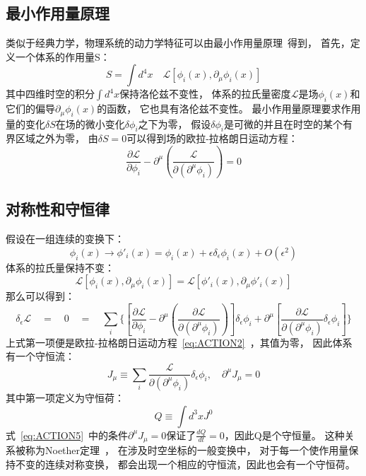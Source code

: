 \subsection{最小作用量原理}
\label{sec:LAP}
类似于经典力学，物理系统的动力学特征可以由最小作用量原理~\cite{ACTION1,ACTION2}得到，
首先，定义一个体系的作用量S：
\begin{equation} 
\label{eq:ACTION1}
S=\int d^4x \quad \mathcal{L}\left[ \phi_i(x),\partial_{\mu}\phi_i(x) \right]
\end{equation}
其中四维时空的积分$\int d^4x$保持洛伦兹不变性，
体系的拉氏量密度$\mathcal{L}$是场$\phi_i(x)$和它们的偏导$\partial_{\mu}\phi_i(x)$的函数，
它也具有洛伦兹不变性。
最小作用量原理要求作用量的变化$\delta S$在场的微小变化$\delta \phi_i$之下为零，
假设$\delta \phi_i$是可微的并且在时空的某个有界区域之外为零，
由$\delta S=0$可以得到场的欧拉-拉格朗日运动方程：
\begin{equation} 
\label{eq:ACTION2}
\frac{\partial\mathcal{L}}{\partial\phi_i}-\partial^{\mu}\left( \frac{\mathcal{L}}{\partial(\partial^{\mu}\phi_i)} \right) =0
\end{equation}

\subsection{对称性和守恒律}
\label{sec:SCL}
假设在一组连续的变换下：
\begin{equation} 
\label{eq:ACTION3}
\phi_i(x) \rightarrow \phi'_i(x)=\phi_i(x)+\epsilon\delta_{\epsilon}\phi_i(x)+O(\epsilon^2)
\end{equation}
体系的拉氏量保持不变：
\begin{equation} 
\label{eq:ACTION4}
\mathcal{L}\left[ \phi_i(x),\partial_{\mu}\phi_i(x) \right]=\mathcal{L}\left[ \phi'_i(x),\partial_{\mu}\phi'_i(x) \right]
\end{equation}
那么可以得到：
\begin{equation} 
\label{eq:ACTION5}
\delta_{\epsilon}\mathcal{L} \quad = \quad 0 \quad = \quad \sum_i \Bigg\{ \left[ \frac{\partial\mathcal{L}}{\partial\phi_i}-\partial^{\mu}\left( \frac{\partial\mathcal{L}}{\partial(\partial^{\mu}\phi_i)} \right) \right] \delta_{\epsilon}\phi_i + \partial^{\mu}  \left[  \frac{\partial\mathcal{L}}{\partial(\partial^{\mu}\phi_i)}\delta_{\epsilon}\phi_i  \right]   \Bigg\}
\end{equation}
上式第一项便是欧拉-拉格朗日运动方程~\ref{eq:ACTION2}~，其值为零，
因此体系有一个守恒流：
\begin{equation} 
\label{eq:ACTION5}
J_{\mu}\equiv\sum_i \frac{\mathcal{L}}{\partial(\partial^{\mu}\phi_i)}\delta_{\epsilon}\phi_i , \quad \partial^{\mu}J_{\mu}=0
\end{equation}
其中第一项定义为守恒荷：
\begin{equation} 
\label{eq:ACTION7}
Q \equiv \int d^3x J^0
\end{equation}
式~\ref{eq:ACTION5}~中的条件$\partial^{\mu}J_{\mu}=0$保证了$\frac{dQ}{dt}=0$，因此Q是个守恒量。
这种关系被称为Noether定理~\cite{NOETHER}，
在涉及时空坐标的一般变换中，
对于每一个使作用量保持不变的连续对称变换，
都会出现一个相应的守恒流，因此也会有一个守恒荷。


